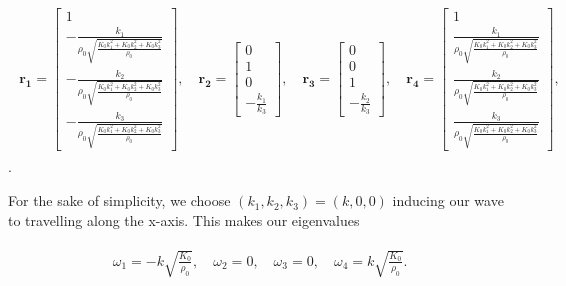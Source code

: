 \begin{align}
    \begin{split}
    \mathbf{r_1} = \begin{bmatrix}
        1 \\
-\frac{k_{1}}{\rho_{0} \sqrt{\frac{K_{0} k_{1}^{2} + K_{0} k_{2}^{2} + K_{0} k_{3}^{2}}{\rho_{0}}}} \\
-\frac{k_{2}}{\rho_{0} \sqrt{\frac{K_{0} k_{1}^{2} + K_{0} k_{2}^{2} + K_{0} k_{3}^{2}}{\rho_{0}}}} \\
-\frac{k_{3}}{\rho_{0} \sqrt{\frac{K_{0} k_{1}^{2} + K_{0} k_{2}^{2} + K_{0} k_{3}^{2}}{\rho_{0}}}}
        \end{bmatrix}, \quad
        \mathbf{r_2} = \begin{bmatrix}
            0 \\
1 \\
0 \\
-\frac{k_{1}}{k_{3}}
            \end{bmatrix}, \quad
            \mathbf{r_3} = \begin{bmatrix}
                0 \\
                0 \\
                1 \\
                -\frac{k_{2}}{k_{3}}
                \end{bmatrix}, \quad
                \mathbf{r_4} = \begin{bmatrix}
                    1 \\
\frac{k_{1}}{\rho_{0} \sqrt{\frac{K_{0} k_{1}^{2} + K_{0} k_{2}^{2} + K_{0} k_{3}^{2}}{\rho_{0}}}} \\
\frac{k_{2}}{\rho_{0} \sqrt{\frac{K_{0} k_{1}^{2} + K_{0} k_{2}^{2} + K_{0} k_{3}^{2}}{\rho_{0}}}} \\
\frac{k_{3}}{\rho_{0} \sqrt{\frac{K_{0} k_{1}^{2} + K_{0} k_{2}^{2} + K_{0} k_{3}^{2}}{\rho_{0}}}}
                    \end{bmatrix},
    \end{split}
\end{align} .

For the sake of simplicity, we choose $\left(k_1,k_2,k_3\right) = \left(k,0,0\right)$ inducing our wave to travelling along the x-axis. This makes our eigenvalues

\begin{align}
    \begin{split}
        \omega_1 = -k \sqrt{\frac{K_{0}}{\rho_{0}}}, \quad
        \omega_2 = 0, \quad
        \omega_3 = 0, \quad
        \omega_4 = k \sqrt{\frac{K_{0}}{\rho_{0}}} .
    \end{split}
\end{align}


